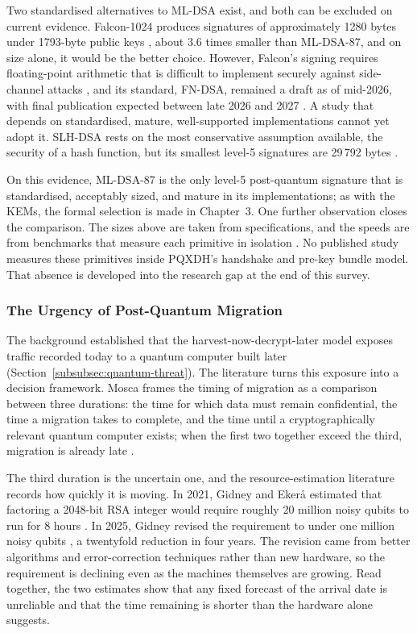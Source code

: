 Two standardised alternatives to ML-DSA exist, and both can be excluded on current evidence. Falcon-1024 produces signatures of approximately 1280 bytes under 1793-byte public keys \cite{fouque_falcon_nodate}, about 3.6 times smaller than ML-DSA-87, and on size alone, it would be the better choice. However, Falcon's signing requires floating-point arithmetic that is difficult to implement securely against side-channel attacks \cite{fouque_falcon_nodate}, and its standard, FN-DSA, remained a draft as of mid-2026, with final publication expected between late 2026 and 2027 \cite{computer_security_division_pqc_2017}. A study that depends on standardised, mature, well-supported implementations cannot yet adopt it. SLH-DSA rests on the most conservative assumption available, the security of a hash function, but its smallest level-5 signatures are 29\,792 bytes \cite{national_institute_of_standards_and_technology_us_stateless_2024}.

On this evidence, ML-DSA-87 is the only level-5 post-quantum signature that is standardised, acceptably sized, and mature in its implementations; as with the KEMs, the formal selection is made in Chapter~3. One further observation closes the comparison. The sizes above are taken from specifications, and the speeds are from benchmarks that measure each primitive in isolation \cite{open_quantum_safe_project_benchmarking_nodate, bernstein_ebacs_nodate}. No published study measures these primitives inside PQXDH's handshake and pre-key bundle model. That absence is developed into the research gap at the end of this survey.

\subsubsection{The Urgency of Post-Quantum Migration}
\label{subsubsec:lit-urgency}

The background established that the harvest-now-decrypt-later model exposes traffic recorded today to a quantum computer built later (Section~\ref{subsubsec:quantum-threat}). The literature turns this exposure into a decision framework. Mosca frames the timing of migration as a comparison between three durations: the time for which data must remain confidential, the time a migration takes to complete, and the time until a cryptographically relevant quantum computer exists; when the first two together exceed the third, migration is already late \cite{mosca_cybersecurity_2018}. 

The third duration is the uncertain one, and the resource-estimation literature records how quickly it is moving. In 2021, Gidney and Eker{\aa} estimated that factoring a 2048-bit RSA integer would require roughly 20 million noisy qubits to run for 8 hours \cite{gidney_how_2021}. In 2025, Gidney revised the requirement to under one million noisy qubits \cite{gidney_how_2025}, a twentyfold reduction in four years. The revision came from better algorithms and error-correction techniques rather than new hardware, so the requirement is declining even as the machines themselves are growing. Read together, the two estimates show that any fixed forecast of the arrival date is unreliable and that the time remaining is shorter than the hardware alone suggests.

